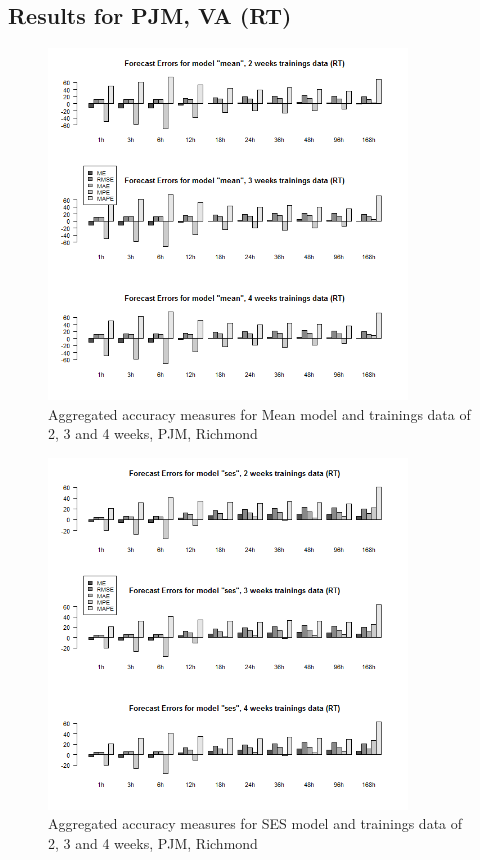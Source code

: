 \FloatBarrier
\subsection{Results for PJM, VA (RT)}



\begin{figure}[!ht]
	\centering
		\includegraphics[width=0.85\textwidth]{figures/appendix_forecast_results/rt_sim_6_x_1w_1w_mean.png}
	\caption{Aggregated accuracy measures for Mean model and trainings data of 2, 3 and 4 weeks, PJM, Richmond}
	\label{fig:app_rt_sim_6_x_1w_1w_mean}
\end{figure}



\begin{figure}[!ht]
	\centering
	\vspace*{-1.2in}
		\includegraphics[width=0.85\textwidth]{figures/appendix_forecast_results/rt_sim_6_x_1w_1w_ses.png}
	\caption{Aggregated accuracy measures for SES model and trainings data of 2, 3 and 4 weeks, PJM, Richmond}
	\label{fig:app_rt_sim_6_x_1w_1w_ses}
\end{figure}

